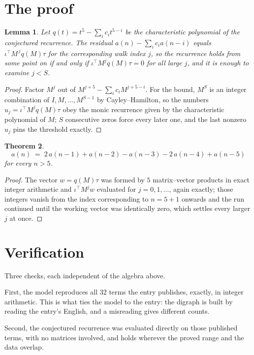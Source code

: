 \documentclass[11pt,a4paper]{article}
\theoremstyle{plain}
\newtheorem{theorem}{Theorem}
\newtheorem{lemma}[theorem]{Lemma}
\theoremstyle{definition}
\begin{document}
\section{The proof}

\begin{lemma}\label{lem:crit}
Let $q(t)=t^{5}-\sum_i c_it^{5-i}$ be the characteristic polynomial of the
conjectured recurrence. The residual $a(n)-\sum_ic_ia(n-i)$ equals
$\iota^{\!\top}M^{\,j}q(M)\tau$ for the corresponding walk index $j$, so the recurrence
holds from some point on if and only if $\iota^{\!\top}M^{j}q(M)\tau=0$ for all large $j$,
and it is enough to examine $j<S$.
\end{lemma}

\begin{proof}
Factor $M^{j}$ out of $M^{j+5}-\sum_ic_iM^{j+5-i}$. For the bound, $M^{S}$
is an integer combination of $I,M,\dots,M^{S-1}$ by Cayley--Hamilton, so the numbers
$u_j=\iota^{\!\top}M^{j}q(M)\tau$ obey the monic recurrence given by the characteristic
polynomial of $M$; $S$ consecutive zeros force every later one, and the last nonzero $u_j$
pins the threshold exactly.
\end{proof}

\begin{theorem}
\[
a(n)\;=\;2\,a(n-1) + a(n-2) - a(n-3) - 2\,a(n-4) + a(n-5)
\]
for every $n>5$.
\end{theorem}

\begin{proof}
The vector $w=q(M)\tau$ was formed by $5$ matrix--vector products in exact integer
arithmetic and $\iota^{\!\top}M^{j}w$ evaluated for $j=0,1,\dots$, again exactly; those
integers vanish from the index corresponding to $n=5+1$ onwards and the run continued
until the working vector was identically zero, which settles every larger $j$ at once.
\end{proof}

\section{Verification}

Three checks, each independent of the algebra above.

First, the model reproduces all $32$ terms the entry publishes, exactly, in integer
arithmetic. This is what ties the model to the entry: the digraph is built by reading the
entry's English, and a misreading gives different counts.

Second, the conjectured recurrence was evaluated directly on those published terms, with no
matrices involved, and holds wherever the proved range and the data overlap.
\end{document}
